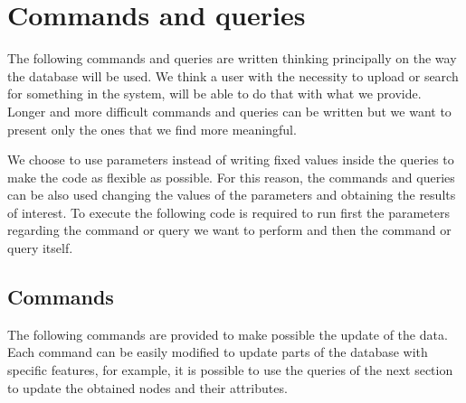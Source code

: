 \chapter{Commands and queries}
\label{ch:commands_and_queries_neo4j}%
The following commands and queries are written thinking principally on the way the database will be used.
We think a user with the necessity to upload or search for something in the system, will be able to do that with what we provide.
Longer and more difficult commands and queries can be written but we want to present only the ones that we find more meaningful.

We choose to use parameters instead of writing fixed values inside the queries to make the code as flexible as possible.
For this reason, the commands and queries can be also used changing the values of the parameters and obtaining the results of interest.
To execute the following code is required to run first the parameters regarding the command or query we want to perform and then the command or query itself.


\section{Commands}
\label{sec:commands}%
The following commands are provided to make possible the update of the data.
Each command can be easily modified to update parts of the database with specific features, for example, it is possible to use the queries of the next section to update the obtained nodes and their attributes.

